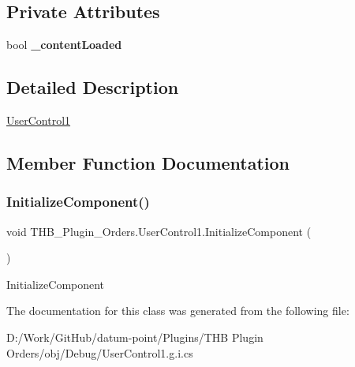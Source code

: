 \subsection*{Private Attributes}
\begin{DoxyCompactItemize}
\item 
\mbox{\label{class_t_h_b___plugin___orders_1_1_user_control1_a7d0a1a76f48fc70682dd70cdbfdcf690}} 
bool {\bfseries \+\_\+content\+Loaded}
\end{DoxyCompactItemize}


\subsection{Detailed Description}
\mbox{\hyperlink{class_t_h_b___plugin___orders_1_1_user_control1}{User\+Control1}} 



\subsection{Member Function Documentation}
\mbox{\label{class_t_h_b___plugin___orders_1_1_user_control1_ab6bf9301231de03e2f7bad2f7d436c3f}} 
\subsubsection{\texorpdfstring{Initialize\+Component()}{InitializeComponent()}}
{\footnotesize\ttfamily void T\+H\+B\+\_\+\+Plugin\+\_\+\+Orders.\+User\+Control1.\+Initialize\+Component (\begin{DoxyParamCaption}{ }\end{DoxyParamCaption})}



Initialize\+Component 



The documentation for this class was generated from the following file\+:\begin{DoxyCompactItemize}
\item 
D\+:/\+Work/\+Git\+Hub/datum-\/point/\+Plugins/\+T\+H\+B Plugin Orders/obj/\+Debug/User\+Control1.\+g.\+i.\+cs\end{DoxyCompactItemize}
